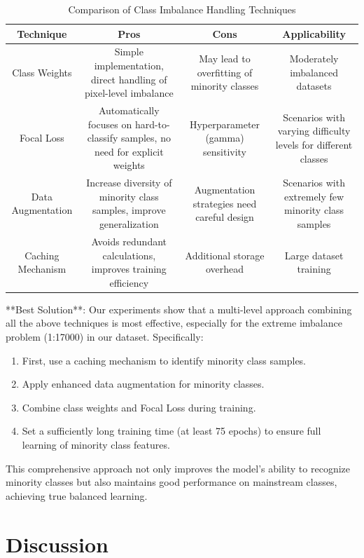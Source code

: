 \documentclass[conference]{IEEEtran}
\begin{document}
\begin{table}
    \centering
    \caption{Comparison of Class Imbalance Handling Techniques}
    \begin{tabular}{|c|c|c|c|}
    \hline
    Technique & Pros & Cons & Applicability \\
    \hline
    Class Weights & Simple implementation, direct handling of pixel-level imbalance & May lead to overfitting of minority classes & Moderately imbalanced datasets \\
    Focal Loss & Automatically focuses on hard-to-classify samples, no need for explicit weights & Hyperparameter (gamma) sensitivity & Scenarios with varying difficulty levels for different classes \\
    Data Augmentation & Increase diversity of minority class samples, improve generalization & Augmentation strategies need careful design & Scenarios with extremely few minority class samples \\
    Caching Mechanism & Avoids redundant calculations, improves training efficiency & Additional storage overhead & Large dataset training \\
    \hline
    \end{tabular}
\end{table}


**Best Solution**: Our experiments show that a multi-level approach combining all the above techniques is most effective, especially for the extreme imbalance problem (1:17000) in our dataset. Specifically:

\begin{enumerate}
    \item First, use a caching mechanism to identify minority class samples.
    \item Apply enhanced data augmentation for minority classes.
    \item Combine class weights and Focal Loss during training.
    \item Set a sufficiently long training time (at least 75 epochs) to ensure full learning of minority class features.
\end{enumerate}

This comprehensive approach not only improves the model's ability to recognize minority classes but also maintains good performance on mainstream classes, achieving true balanced learning.


\section{Discussion}
\end{document}
